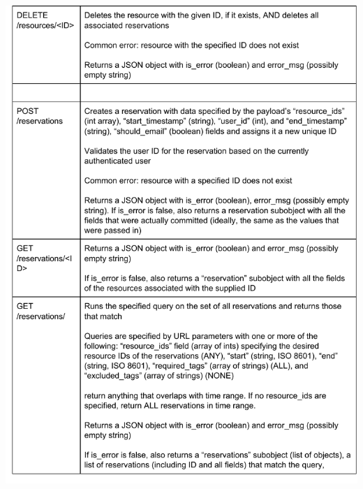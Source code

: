 \documentclass[12pt]{article}
\begin{document}
\includegraphics[width=6in]{../ev3/apispec_02.pdf}
\end{document}
